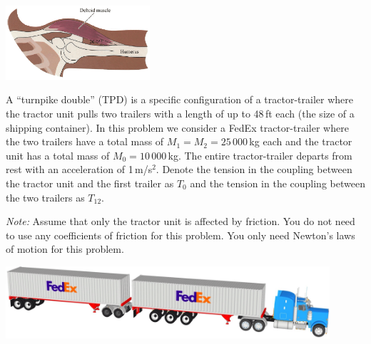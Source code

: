 \documentclass[letterpaper,addpoints,answers]{exam}
\begin{document}
\begin{questions}
\begin{center}
 \includegraphics[width=0.4\textwidth]{test1/humerus-deltoid}
\end{center}



\pagebreak

\question
A ``turnpike double'' (TPD) is a specific configuration of a tractor-trailer where the tractor unit pulls two trailers with a length of up to 48\,ft each (the size of a shipping container). In this problem we consider a FedEx tractor-trailer where the two trailers have a total mass of $M_1 = M_2 = 25\,000$\,kg each and the tractor unit has a total mass of $M_0 = 10\,000$\,kg. The entire tractor-trailer departs from rest with an acceleration of 1\,m/s$^2$. Denote the tension in the coupling between the tractor unit and the first trailer as $T_0$ and the tension in the coupling between the two trailers as $T_{12}$.

\emph{Note:} Assume that only the tractor unit is affected by friction. You do not need to use any coefficients of friction for this problem. You only need Newton's laws of motion for this problem.
\begin{center}
 \includegraphics[width=0.9\textwidth]{test1/tpd}
\end{center}


\end{questions}
\end{document}
